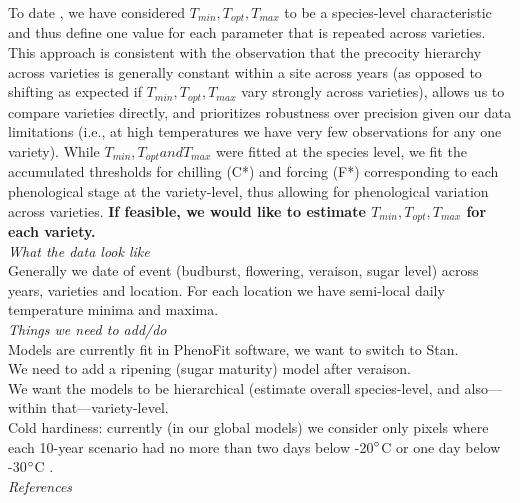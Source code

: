 \documentclass[11pt,letter]{article}
\begin{document}
To date \citep[and following many other crops and approaches in winegrapes][]{Parker:2011cr,parent2012}, we have considered $T_{min}, T_{opt}, T_{max}$ to be a species-level characteristic and thus define one value for each parameter that is repeated across varieties. This approach is consistent with the observation that the precocity hierarchy across varieties is generally constant within a site across years (as opposed to shifting as expected if $T_{min}, T_{opt}, T_{max}$ vary strongly across varieties), allows us to compare varieties directly, and prioritizes robustness over precision given our data limitations (i.e., at high temperatures we have very few observations for any one variety). While $T_{min}, T_{opt} and T_{max}$ were fitted at the species level, we fit the accumulated thresholds for chilling (C*) and forcing (F*) corresponding to each phenological stage at the variety-level, thus allowing for phenological variation across varieties. {\bf If feasible, we would like to estimate $T_{min}, T_{opt}, T_{max}$ for each variety.}\\

\emph{What the data look like}\\
Generally we date of event (budburst, flowering, veraison, sugar level) across years, varieties and location. For each location we have semi-local daily temperature minima and maxima. \\


\emph{Things we need to add/do}\\
Models are currently fit in PhenoFit software, we want to switch to Stan.\\

We need to add a ripening (sugar maturity) model after veraison.\\

We want the models to be hierarchical (estimate overall species-level, and also---within that---variety-level.\\

Cold hardiness: currently (in our global models) we consider only pixels where each 10-year scenario had no more than two days below -20$\degree$C or one day below -30$\degree$C \citep{Mills2006,Davenport2008}. \\

\emph{References}

\end{document}
